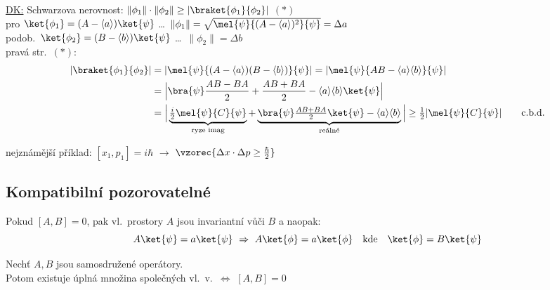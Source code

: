 \underline{DK:} \quad Schwarzova nerovnost: \quad $\|\phi_1\|\cdot\|\phi_2\| \geq |\braket{\phi_1}{\phi_2}|$ \quad $(*)$ \\
\quad pro \quad $\ket{\phi_1} = (A - \langle a\rangle)\ket{\psi}$ \quad \dots\ $\|\phi_1\| = \sqrt{\mel{\psi}{(A - \langle a\rangle)^2}{\psi}} = \Delta a$ \\
\quad podob.\ \quad $\ket{\phi_2} = (B - \langle b\rangle)\ket{\psi}$ \quad \dots\ $\|\phi_2\| = \Delta b$ \\
pravá str.\ $(*)$:
\begin{align*}
  |\braket{\phi_1}{\phi_2}| &= |\mel{\psi}{(A - \langle a\rangle)(B - \langle b\rangle)}{\psi}| = |\mel{\psi}{AB - \langle a\rangle\langle b\rangle}{\psi}| \\
  &= \Big|\bra{\psi}\frac{AB - BA}{2} + \frac{AB + BA}{2} - \langle a\rangle\langle b\rangle\ket{\psi}\Big| \\
  &= \Big|\underbrace{\tfrac{i}{2}\mel{\psi}{C}{\psi}}_{\text{ryze imag}} + \underbrace{\bra{\psi}\tfrac{AB+BA}{2}\ket{\psi} - \langle a\rangle\langle b\rangle}_{\text{reálné}}\Big|
  \geq \tfrac12|\mel{\psi}{C}{\psi}| \qquad\text{c.b.d.}
\end{align*}

nejznámější příklad: \quad $[x_1,p_1] = i\hbar$ \quad $\to$ \quad $\vzorec{\Delta x\cdot\Delta p \geq \tfrac{\hbar}{2}}$

\subsection*{Kompatibilní pozorovatelné}
\begin{veta}
Pokud $[A,B] = 0$, pak vl.\ prostory $A$ jsou invariantní vůči $B$ a naopak:
\[ A\ket{\psi} = a\ket{\psi} \ \Rightarrow\ A\ket{\phi} = a\ket{\phi} \quad\text{kde}\quad \ket{\phi} = B\ket{\psi} \]
\end{veta}

\begin{veta}
Nechť $A, B$ jsou samosdružené operátory. \\
Potom existuje úplná množina společných vl.\ v.\ $\Leftrightarrow$ $[A,B] = 0$
\end{veta}

